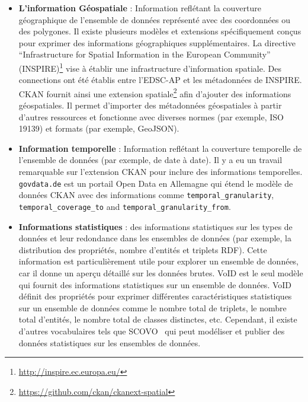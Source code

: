 \begin{itemize}
	\item \textbf{L'information G\'{e}ospatiale} : Information refl\'{e}tant la couverture g\'{e}ographique de l'ensemble de donn\'{e}es repr\'{e}sent\'{e} avec des coordonn\'{e}es ou des polygones. Il existe plusieurs mod\`{e}les et extensions sp\'{e}cifiquement conçus pour exprimer des informations g\'{e}ographiques suppl\'{e}mentaires. La directive ``Infrastructure for Spatial Information in the European Community'' (INSPIRE)\footnote{\url{http://inspire.ec.europa.eu/}} vise \`{a} \'{e}tablir une infrastructure d'information spatiale. Des connections ont \'{e}t\'{e} \'{e}tablis entre l'EDSC-AP et les m\'{e}tadonn\'{e}es de INSPIRE. CKAN fournit ainsi une extension spatiale\footnote{\url{https://github.com/ckan/ckanext-spatial}} afin d'ajouter des informations g\'{e}ospatiales. Il permet d'importer des m\'{e}tadonn\'{e}es g\'{e}ospatiales \`{a} partir d'autres ressources et fonctionne avec diverses normes (par exemple, ISO 19139) et formats (par exemple, GeoJSON).
	\item \textbf{Information temporelle} : Information refl\'{e}tant la couverture temporelle de l'ensemble de donn\'{e}es (par exemple, de date \`{a} date). Il y a eu un travail remarquable sur l'extension CKAN pour inclure des informations temporelles. \texttt{govdata.de} est un portail Open Data en Allemagne qui \'{e}tend le mod\`{e}le de donn\'{e}es CKAN avec des informations comme \texttt{temporal\_granularity}, \texttt{temporal\_coverage\_to} and \texttt{temporal\_granularity\_from}.
	\item \textbf{Informations statistiques} : des informations statistiques sur les types de donn\'{e}es et leur redondance dans les ensembles de donn\'{e}es (par exemple, la distribution des propri\'{e}t\'{e}s, nombre d'entit\'{e}s et triplets RDF). Cette information est particuli\`{e}rement utile pour explorer un ensemble de donn\'{e}es, car il donne un aperçu d\'{e}taill\'{e} sur les donn\'{e}es brutes. VoID est le seul mod\`{e}le qui fournit des informations statistiques sur un ensemble de donn\'{e}es. VoID d\'{e}finit des propri\'{e}t\'{e}s pour exprimer diff\'{e}rentes caract\'{e}ristiques statistiques sur un ensemble de donn\'{e}es comme le nombre total de triplets, le nombre total d'entit\'{e}s, le nombre total de classes distinctes, etc. Cependant, il existe d'autres vocabulaires tels que SCOVO~\cite{Hausenblas:ESWC:09} qui peut mod\'{e}liser et publier des donn\'{e}es statistiques sur les ensembles de donn\'{e}es.

\end{itemize}
